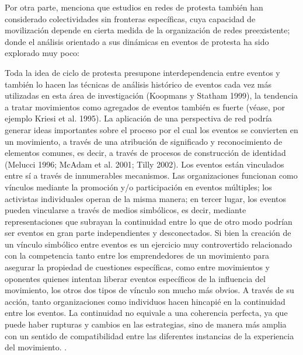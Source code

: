 \documentclass[letterpaper, 11pt]{book}
\theoremstyle{definition}
\theoremstyle{remark}
\begin{document}
Por otra parte, \citet{2003_Diani_SocialNetworks} menciona que estudios en redes de protesta también han considerado colectividades sin fronteras específicas, cuya capacidad de movilización depende en cierta medida de la organización de redes preexistente; donde el análisis orientado a sus dinámicas en eventos de protesta ha sido explorado muy poco: 

\begin{center}
    \begin{minipage}{0.9\linewidth}
        {\setlength{\parindent}{12pt}\small
        Toda la idea de ciclo de protesta presupone interdependencia entre eventos y también lo hacen las técnicas de análisis histórico de eventos cada vez más utilizadas en esta área de investigación (Koopmans y Statham 1999), la tendencia a tratar movimientos como agregados de eventos también es fuerte (véase, por ejemplo Kriesi et al. 1995). 
        La aplicación de una perspectiva de red podría generar ideas importantes sobre el proceso por el cual los eventos se convierten en un movimiento, a través de una atribución de significado y reconocimiento de elementos comunes, es decir, a través de procesos de construcción de identidad (Melucci 1996; McAdam et al. 2001; Tilly 2002). 
        Los eventos están vinculados entre sí a través de innumerables mecanismos. 
        Las organizaciones funcionan como vínculos mediante la promoción y/o participación en eventos múltiples;  los activistas individuales operan de la misma manera; en tercer lugar, los eventos pueden vincularse a través de medios simbólicos, es decir, mediante representaciones que subrayan la continuidad entre lo que de otro modo podrían ser eventos en gran parte independientes y desconectados. 
        Si bien la creación de un vínculo simbólico entre eventos es un ejercicio muy controvertido relacionado con la competencia tanto entre los emprendedores de un movimiento para asegurar la propiedad de cuestiones específicas, como entre movimientos y oponentes quienes intentan liberar eventos específicos de la influencia del movimiento, los otros dos tipos de vínculo son mucho más obvios. 
        A través de su acción, tanto organizaciones como individuos hacen hincapié en la continuidad entre los eventos. 
        La continuidad no equivale a una coherencia perfecta, ya que puede haber rupturas y cambios en las estrategias, sino de manera más amplia con un sentido de compatibilidad entre las diferentes instancias de la experiencia del movimiento. 
        \normalsize \citep[11--12]{2003_Diani_SocialNetworks}.
        }
    \end{minipage}
\end{center}
\end{document}
